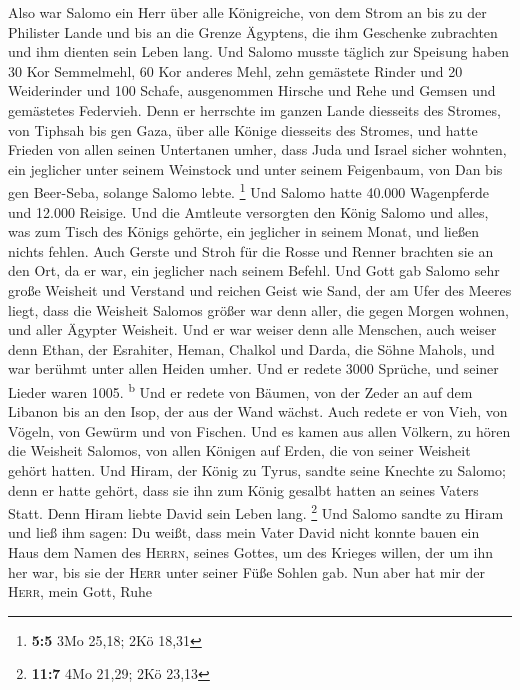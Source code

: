 Also war Salomo ein Herr über alle Königreiche, von dem
Strom an bis zu der Philister Lande und bis an die Grenze Ägyptens, die
ihm Geschenke zubrachten und ihm dienten sein Leben lang. 
Und Salomo musste täglich zur Speisung haben 30 Kor Semmelmehl, 60 Kor
anderes Mehl,  zehn gemästete Rinder und 20 Weiderinder
und 100 Schafe, ausgenommen Hirsche und Rehe und Gemsen und gemästetes
Federvieh.  Denn er herrschte im ganzen Lande diesseits
des Stromes, von Tiphsah bis gen Gaza, über alle Könige diesseits des
Stromes, und hatte Frieden von allen seinen Untertanen umher,
 dass Juda und Israel sicher wohnten, ein jeglicher unter
seinem Weinstock und unter seinem Feigenbaum, von Dan bis gen Beer-Seba,
solange Salomo lebte. \footnote{\textbf{5:5} 3Mo 25,18; 2Kö 18,31}
 Und Salomo hatte 40.000 Wagenpferde und 12.000 Reisige.
 Und die Amtleute versorgten den König Salomo und alles,
was zum Tisch des Königs gehörte, ein jeglicher in seinem Monat, und
ließen nichts fehlen.  Auch Gerste und Stroh für die Rosse
und Renner brachten sie an den Ort, da er war, ein jeglicher nach seinem
Befehl.  Und Gott gab Salomo sehr große Weisheit und
Verstand und reichen Geist wie Sand, der am Ufer des Meeres liegt,
 dass die Weisheit Salomos größer war denn aller, die
gegen Morgen wohnen, und aller Ägypter Weisheit.  Und er
war weiser denn alle Menschen, auch weiser denn Ethan, der Esrahiter,
Heman, Chalkol und Darda, die Söhne Mahols, und war berühmt unter allen
Heiden umher.  Und er redete 3000 Sprüche, und seiner
Lieder waren 1005. \textsuperscript{b}  Und er redete von
Bäumen, von der Zeder an auf dem Libanon bis an den Isop, der aus der
Wand wächst. Auch redete er von Vieh, von Vögeln, von Gewürm und von
Fischen.  Und es kamen aus allen Völkern, zu hören die
Weisheit Salomos, von allen Königen auf Erden, die von seiner Weisheit
gehört hatten.  Und Hiram, der König zu Tyrus, sandte
seine Knechte zu Salomo; denn er hatte gehört, dass sie ihn zum König
gesalbt hatten an seines Vaters Statt. Denn Hiram liebte David sein
Leben lang. \footnote{\textbf{11:7} 4Mo 21,29; 2Kö 23,13}
 Und Salomo sandte zu Hiram und ließ ihm sagen:
 Du weißt, dass mein Vater David nicht konnte bauen ein
Haus dem Namen des \textsc{Herrn}, seines Gottes, um des Krieges willen,
der um ihn her war, bis sie der \textsc{Herr} unter seiner Füße Sohlen
gab.  Nun aber hat mir der \textsc{Herr}, mein Gott, Ruhe
